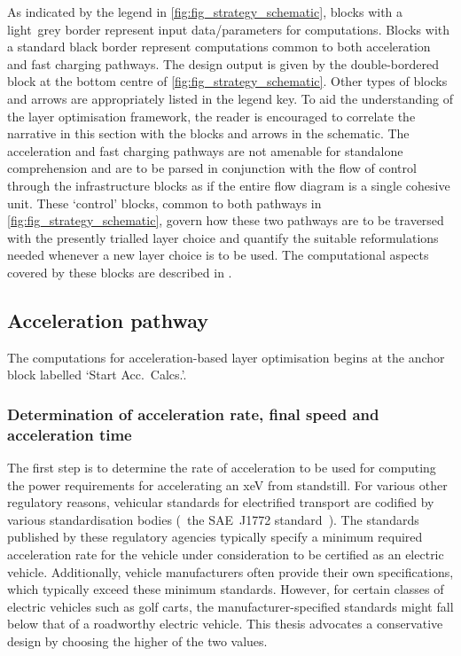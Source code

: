 As indicated by  the legend in \cref{fig:fig_strategy_schematic},  blocks with a
light~grey border represent input  data/parameters for computations. Blocks with
a standard black  border represent computations common to  both acceleration and
fast charging pathways. The design output  is given by the double-bordered block
at  the  bottom  centre  of \cref{fig:fig_strategy_schematic}.  Other  types  of
blocks  and arrows  are  appropriately listed  in  the legend  key.  To aid  the
understanding of the  layer optimisation framework, the reader  is encouraged to
correlate  the narrative  in this  section  with the  blocks and  arrows in  the
schematic.  The  acceleration  and  fast  charging  pathways  are  not  amenable
for  standalone comprehension  and  are to  be parsed  in  conjunction with  the
flow  of  control through  the  infrastructure  blocks  as  if the  entire  flow
diagram  is a  single  cohesive unit.  These `control'  blocks,  common to  both
pathways  in \cref{fig:fig_strategy_schematic},  govern how  these two  pathways
are  to be  traversed  with the  presently trialled  layer  choice and  quantify
the  suitable  reformulations needed  whenever  a  new  layer  choice is  to  be
used.  The  computational aspects  covered  by  these  blocks are  described  in
.

\subsection{Acceleration pathway}\label{sec:accpathway}

The computations for acceleration-based layer  optimisation begins at the anchor
block labelled `Start Acc.\ Calcs.'.

\subsubsection*{Determination of acceleration rate, final speed and acceleration time}

The  first  step is  to  determine  the rate  of  acceleration  to be  used  for
computing the power requirements for  accelerating an \gls{xeV} from standstill.
For  various  other  regulatory  reasons, vehicular  standards  for  electrified
transport are  codified by various  standardisation bodies (\eg~the SAE~J1772
standard~\cite{Sae2010}). The  standards published by these  regulatory agencies
typically specify  a minimum  required acceleration rate  for the  vehicle under
consideration  to be  certified as  an electric  vehicle. Additionally,  vehicle
manufacturers  often provide  their own  specifications, which  typically exceed
these minimum standards. However, for  certain classes of electric vehicles such
as golf carts,  the manufacturer-specified standards might fall below  that of a
roadworthy  electric vehicle.  This thesis  advocates a  conservative design  by
choosing the higher of the two values.

